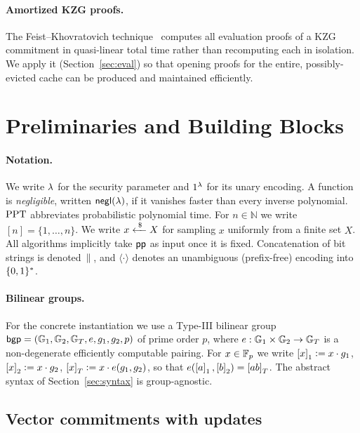 \paragraph{Amortized KZG proofs.}
The Feist--Khovratovich technique~\cite{fk} computes all evaluation proofs of a
KZG commitment in quasi-linear total time rather than recomputing each in
isolation. We apply it (Section~\ref{sec:eval}) so that opening proofs for the
entire, possibly-evicted cache can be produced and maintained efficiently.

\section{Preliminaries and Building Blocks}\label{sec:prelim}

\paragraph{Notation.}
We write $\lambda$ for the security parameter and $1^\lambda$ for its unary
encoding. A function is \emph{negligible}, written $\mathsf{negl}(\lambda)$, if it
vanishes faster than every inverse polynomial. $\mathrm{PPT}$ abbreviates probabilistic
polynomial time. For $n\in\mathbb{N}$ we write $[n]=\{1,\dots,n\}$. We write
$x\xleftarrow{\;\$\;} X$ for sampling $x$ uniformly from a finite set $X$. All algorithms
implicitly take $\mathsf{pp}$ as input once it is fixed. Concatenation of bit strings is
denoted $\,\|\,$, and $\langle\cdot\rangle$ denotes an unambiguous (prefix-free)
encoding into $\{0,1\}^{*}$.

\paragraph{Bilinear groups.}
For the concrete instantiation we use a Type-III bilinear group
$\mathsf{bgp}=(\mathbb{G}_1,\mathbb{G}_2,\mathbb{G}_T,e,g_1,g_2,p)$ of prime order $p$, where
$e:\mathbb{G}_1\times\mathbb{G}_2\to\mathbb{G}_T$ is a non-degenerate efficiently computable pairing.
For $x\in\mathbb{F}_p$ we write $\left[x\right]_{1}\vcentcolon= x\cdot g_1$, $\left[x\right]_{2}\vcentcolon= x\cdot g_2$,
$\left[x\right]_{T}\vcentcolon= x\cdot e(g_1,g_2)$, so that $e(\left[a\right]_{1},\left[b\right]_{2})=\left[ab\right]_{T}$. The
abstract syntax of Section~\ref{sec:syntax} is group-agnostic.

\subsection{Vector commitments with updates}

